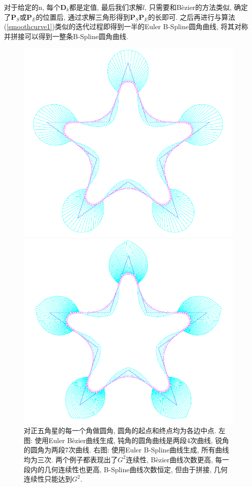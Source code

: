 \documentclass[utf8]{ctexart} %
\begin{document}
	对于给定的n, 每个$\boldsymbol{D}_k$都是定值, 最后我们求解$l$, 只需要和B\`ezier的方法类似, 确定了$\boldsymbol{P}_S$或$\boldsymbol{P}_E$的位置后, 通过求解三角形得到$\boldsymbol{P}_S\boldsymbol{P}_E$的长即可. 之后再进行与算法(\ref{smoothcurve1})类似的迭代过程即得到一半的Euler B-Spline圆角曲线, 将其对称并拼接可以得到一整条B-Spline圆角曲线.
	\begin{figure}[htbp]\label{pentagram}
		\centering
		\begin{minipage}{0.49\linewidth}
			\centering
			\includegraphics[width=0.9\linewidth]{figures/SmoothingCorner3.png}
		\end{minipage}
		\begin{minipage}{0.49\linewidth}
			\centering
			\includegraphics[width=0.9\linewidth]{figures/SmoothingCorner4.png}
		\end{minipage}
		\caption{\small{对正五角星的每一个角做圆角, 圆角的起点和终点均为各边中点. 左图: 使用Euler B\`ezier曲线生成, 钝角的圆角曲线是两段4次曲线, 锐角的圆角为两段7次曲线. 右图: 使用Euler B-Spline曲线生成, 所有曲线均为三次. 两个例子都表现出了$G^2$连续性, B\`ezier曲线次数更高, 每一段内的几何连续性也更高, B-Spline曲线次数恒定, 但由于拼接, 几何连续性只能达到$G^2$.}}
	\end{figure}
\end{document}

